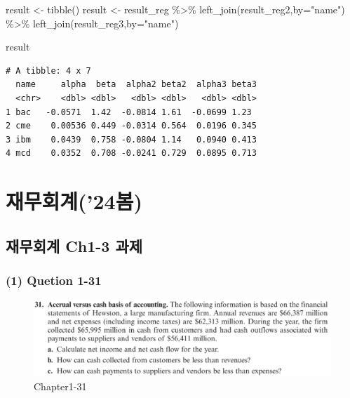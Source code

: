 \documentclass[
  a4paper,
  DIV=11,
  numbers=noendperiod]{scrreprt}
\newenvironment{Shaded}{\begin{snugshade}}{\end{snugshade}}
\newcommand{\AttributeTok}[1]{\textcolor[rgb]{0.40,0.45,0.13}{#1}}
\newcommand{\FunctionTok}[1]{\textcolor[rgb]{0.28,0.35,0.67}{#1}}
\newcommand{\NormalTok}[1]{\textcolor[rgb]{0.00,0.23,0.31}{#1}}
\newcommand{\OtherTok}[1]{\textcolor[rgb]{0.00,0.23,0.31}{#1}}
\newcommand{\SpecialCharTok}[1]{\textcolor[rgb]{0.37,0.37,0.37}{#1}}
\newcommand{\StringTok}[1]{\textcolor[rgb]{0.13,0.47,0.30}{#1}}
\begin{document}
\begin{Shaded}
\begin{Highlighting}[]
\NormalTok{result }\OtherTok{\textless{}{-}} \FunctionTok{tibble}\NormalTok{()}
\NormalTok{result }\OtherTok{\textless{}{-}}\NormalTok{ result\_reg }\SpecialCharTok{\%\textgreater{}\%} 
  \FunctionTok{left\_join}\NormalTok{(result\_reg2,}\AttributeTok{by=}\StringTok{"name"}\NormalTok{) }\SpecialCharTok{\%\textgreater{}\%} 
  \FunctionTok{left\_join}\NormalTok{(result\_reg3,}\AttributeTok{by=}\StringTok{"name"}\NormalTok{)}

\NormalTok{result}
\end{Highlighting}
\end{Shaded}

\begin{verbatim}
# A tibble: 4 x 7
  name     alpha  beta  alpha2 beta2  alpha3 beta3
  <chr>    <dbl> <dbl>   <dbl> <dbl>   <dbl> <dbl>
1 bac   -0.0571  1.42  -0.0814 1.61  -0.0699 1.23 
2 cme    0.00536 0.449 -0.0314 0.564  0.0196 0.345
3 ibm    0.0439  0.758 -0.0804 1.14   0.0940 0.413
4 mcd    0.0352  0.708 -0.0241 0.729  0.0895 0.713
\end{verbatim}

\part{재무회계('24봄)}

\chapter*{재무회계 Ch1-3
과제}\label{uxc7acuxbb34uxd68cuxacc4-ch1-3-uxacfcuxc81c}


\section*{(1) Quetion 1-31}\label{quetion-1-31}


\begin{figure}[H]

{\centering \includegraphics{images/재무회계_hw2_1-31.png}

}

\caption{Chapter1-31}

\end{figure}%
\end{document}
